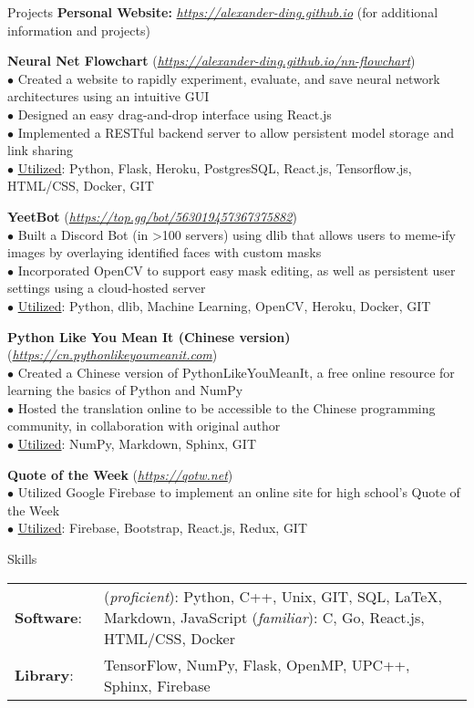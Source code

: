 \documentclass{resume} %
\begin{document}
\begin{rSection}{Projects}
{\bf Personal Website:} {\small \href{https://alexander-ding.github.io}{\textit{https://alexander-ding.github.io}} (for additional information and projects)}

{\bf Neural Net Flowchart} {\small (\href{https://alexander-ding.github.io/nn-flowchart}{\textit{https://alexander-ding.github.io/nn-flowchart}})}
\\$\bullet$ Created a website to rapidly experiment, evaluate, and save neural network architectures using an intuitive GUI
\\$\bullet$ Designed an easy drag-and-drop interface using React.js
\\$\bullet$ Implemented a RESTful backend server to allow persistent model storage and link sharing
\\$\bullet$ \underline{Utilized}: Python, Flask, Heroku, PostgresSQL, React.js, Tensorflow.js, HTML/CSS, Docker, GIT

{\bf YeetBot} {\small (\href{https://top.gg/bot/563019457367375882}{\textit{https://top.gg/bot/563019457367375882}})}
\\$\bullet$ Built a Discord Bot (in >100 servers) using dlib that allows users to meme-ify images by overlaying identified faces with custom masks
\\$\bullet$ Incorporated OpenCV to support easy mask editing, as well as persistent user settings using a cloud-hosted server
\\$\bullet$ \underline{Utilized}: Python, dlib, Machine Learning, OpenCV, Heroku, Docker, GIT

{\bf Python Like You Mean It (Chinese version)} {\small (\href{https://cn.pythonlikeyoumeanit.com}{\textit{https://cn.pythonlikeyoumeanit.com}})}
\\$\bullet$ Created a Chinese version of PythonLikeYouMeanIt, a free online resource for learning the basics of Python and NumPy
\\$\bullet$ Hosted the translation online to be accessible to the Chinese programming community, in collaboration with original author
\\$\bullet$ \underline{Utilized}: NumPy, Markdown, Sphinx, GIT

{\bf Quote of the Week} {\small (\href{https://qotw.net/}{\textit{https://qotw.net}})}
\\$\bullet$ Utilized Google Firebase to implement an online site for high school's Quote of the Week
\\$\bullet$ \underline{Utilized}: Firebase, Bootstrap, React.js, Redux, GIT

\end{rSection}

\begin{rSection}{Skills}
\begin{tabular}{@{}l@{}l@{}}
    {\bf Software}:~ & (\textit{proficient}): Python, C++, Unix, GIT, SQL, LaTeX, Markdown, JavaScript (\textit{familiar}): C, Go, React.js, HTML/CSS, Docker \\
    {\bf Library}:~ & TensorFlow, NumPy, Flask, OpenMP, UPC++, Sphinx, Firebase
\end{tabular}
\end{rSection}
\end{document}
